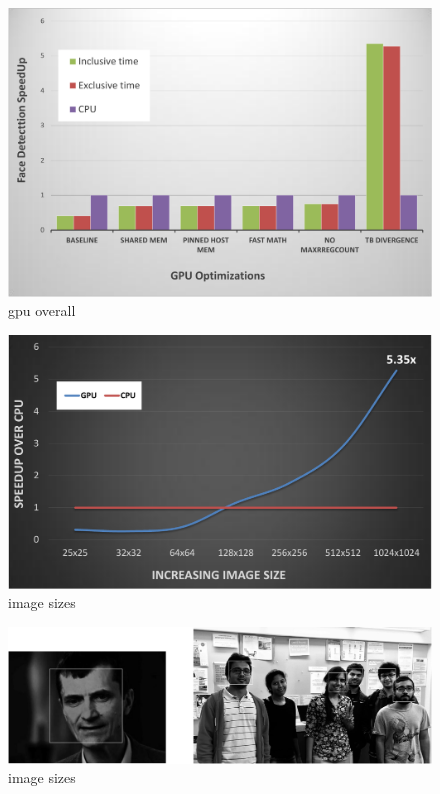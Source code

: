 \begin{figure}[h]
  \centering
  \includegraphics[width=\linewidth]{figs/gpu_overall_crop.pdf}
  \caption{gpu overall}
  \label{fig:haar_kernels}
\end{figure}


\begin{figure}[h]
  \centering
  \includegraphics[width=\linewidth]{figs/image_size_crop.pdf}
  \caption{image sizes}
  \label{fig:haar_kernels}
\end{figure}


\begin{figure}[h]
  \centering
  \includegraphics[width=\linewidth]{figs/face_detected_crop.pdf}
  \caption{image sizes}
  \label{fig:haar_kernels}
\end{figure}



